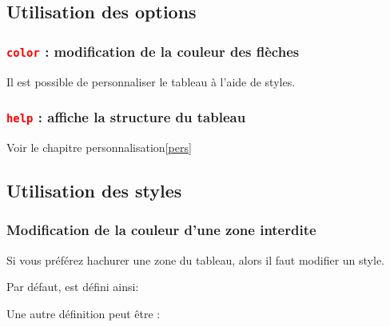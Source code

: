 \subsection{Utilisation des options}

\subsubsection{\texttt{\textcolor{red}{color}} : modification de la couleur des flèches}
Il est possible de personnaliser le tableau à l'aide de styles.
\begin{tkzexample}
\end{tkzexample} 
 
\subsubsection{\texttt{\textcolor{red}{help}} : affiche la structure du tableau} 
Voir le chapitre personnalisation\ref{pers}
\subsection{Utilisation des styles}
 
\subsubsection{Modification de la couleur d'une zone interdite}
Si vous préférez hachurer une zone du tableau, alors  il faut modifier un style. 

Par défaut,   est défini ainsi:
\begin{tkzexample} 
\end{tkzexample}

Une autre définition peut être :

\begin{tkzexample}
\end{tkzexample}


